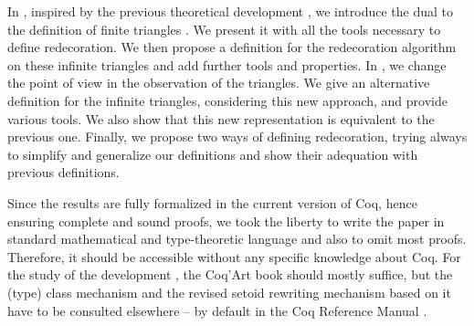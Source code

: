 In , inspired by the previous theoretical development
\cite{grossestcspaper}, we introduce the dual to the definition of
finite triangles \cite{types07}. We present it with all the
tools necessary to define redecoration. We then propose a definition
for the redecoration algorithm on these infinite triangles and add
further tools and properties. In , we change the point
of view in the observation of the triangles. We give an alternative
definition for the infinite triangles, considering this new approach,
and provide various tools. We also show that this new representation
is equivalent to the previous one. Finally, we propose two ways of
defining redecoration, trying always to simplify and generalize our
definitions and show their adequation with previous definitions.

Since the results are fully formalized in the current version of Coq,
hence ensuring complete and sound proofs, we took the liberty to write the paper in
standard mathematical and type-theoretic language and also to omit
most proofs. Therefore, it should be accessible without any specific
knowledge about Coq. For the study of the development
\cite{TYPES11code}, the Coq'Art book \cite{coqart} should mostly suffice, but
the (type) class mechanism \cite{DBLP:conf/tphol/SozeauO08} and the
revised setoid rewriting mechanism based on it have to be consulted
elsewhere -- by default in the Coq Reference Manual \cite{MC}.


